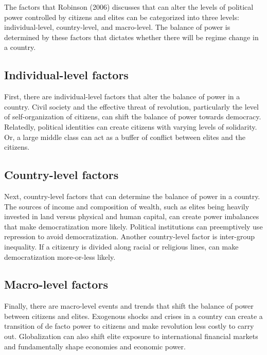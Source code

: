 \documentclass[12pt,]{article}
\begin{document}
The factors that Robinson (2006) discusses that can alter the levels of
political power controlled by citizens and elites can be categorized
into three levels: individual-level, country-level, and macro-level. The
balance of power is determined by these factors that dictates whether
there will be regime change in a country.

\hypertarget{individual-level-factors}{%
\subsection{Individual-level factors}\label{individual-level-factors}}

First, there are individual-level factors that alter the balance of
power in a country. Civil society and the effective threat of
revolution, particularly the level of self-organization of citizens, can
shift the balance of power towards democracy. Relatedly, political
identities can create citizens with varying levels of solidarity. Or, a
large middle class can act as a buffer of conflict between elites and
the citizens.

\hypertarget{country-level-factors}{%
\subsection{Country-level factors}\label{country-level-factors}}

Next, country-level factors that can determine the balance of power in a
country. The sources of income and composition of wealth, such as elites
being heavily invested in land versus physical and human capital, can
create power imbalances that make democratization more likely. Political
institutions can preemptively use repression to avoid democratization.
Another country-level factor is inter-group inequality. If a citizenry
is divided along racial or religious lines, can make democratization
more-or-less likely.

\hypertarget{macro-level-factors}{%
\subsection{Macro-level factors}\label{macro-level-factors}}

Finally, there are macro-level events and trends that shift the balance
of power between citizens and elites. Exogenous shocks and crises in a
country can create a transition of de facto power to citizens and make
revolution less costly to carry out. Globalization can also shift elite
exposure to international financial markets and fundamentally shape
economies and economic power.
\end{document}
